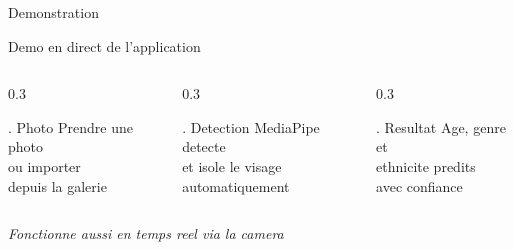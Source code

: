 \documentclass[aspectratio=169, 12pt]{beamer}
\begin{document}
\begin{frame}{Demonstration}
\begin{center}
{\Large\color{navy} Demo en direct de l'application}

\vspace{0.6cm}

\begin{columns}[T]
\begin{column}{0.3\textwidth}
\begin{block}{. Photo}
\centering
Prendre une photo\\ou importer\\depuis la galerie
\end{block}
\end{column}
\begin{column}{0.3\textwidth}
\begin{block}{. Detection}
\centering
MediaPipe detecte\\et isole le visage\\automatiquement
\end{block}
\end{column}
\begin{column}{0.3\textwidth}
\begin{block}{. Resultat}
\centering
Age, genre et\\ethnicite predits\\avec confiance
\end{block}
\end{column}
\end{columns}

\vspace{0.5cm}
{\color{steel}\textit{Fonctionne aussi en temps reel via la camera}}
\end{center}
\end{frame}
\end{document}
